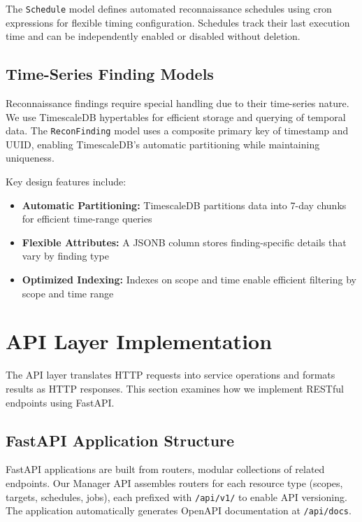\documentclass[a4paper,12pt]{report}
\begin{document}
The \texttt{Schedule} model defines automated reconnaissance schedules using cron expressions for flexible timing configuration. Schedules track their last execution time and can be independently enabled or disabled without deletion.\hfill \break

\subsection{Time-Series Finding Models}

Reconnaissance findings require special handling due to their time-series nature. We use TimescaleDB hypertables for efficient storage and querying of temporal data. The \texttt{ReconFinding} model uses a composite primary key of timestamp and UUID, enabling TimescaleDB's automatic partitioning while maintaining uniqueness.\hfill \break

Key design features include:
\begin{itemize}
\item \textbf{Automatic Partitioning:} TimescaleDB partitions data into 7-day chunks for efficient time-range queries
\item \textbf{Flexible Attributes:} A JSONB column stores finding-specific details that vary by finding type
\item \textbf{Optimized Indexing:} Indexes on scope and time enable efficient filtering by scope and time range
\end{itemize}

\section{API Layer Implementation}

The API layer translates HTTP requests into service operations and formats results as HTTP responses. This section examines how we implement RESTful endpoints using FastAPI.

\subsection{FastAPI Application Structure}

FastAPI applications are built from routers, modular collections of related endpoints. Our Manager API assembles routers for each resource type (scopes, targets, schedules, jobs), each prefixed with \texttt{/api/v1/} to enable API versioning. The application automatically generates OpenAPI documentation at \texttt{/api/docs}.\hfill \break
\end{document}

